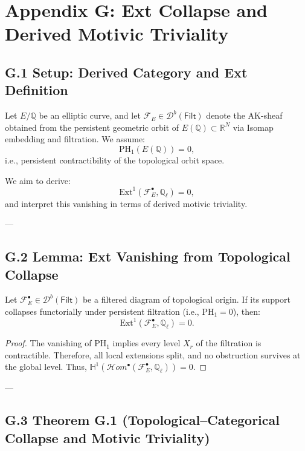 \section*{Appendix G: Ext Collapse and Derived Motivic Triviality}

\subsection*{G.1 Setup: Derived Category and Ext Definition}

Let \( E/\mathbb{Q} \) be an elliptic curve, and let \( \mathcal{F}_E \in \mathcal{D}^b(\mathsf{Filt}) \) denote the AK-sheaf obtained from the persistent geometric orbit of \( E(\mathbb{Q}) \subset \mathbb{R}^N \) via Isomap embedding and filtration.  
We assume:
\[
\mathrm{PH}_1(E(\mathbb{Q})) = 0,
\]
i.e., persistent contractibility of the topological orbit space.

We aim to derive:
\[
\mathrm{Ext}^1(\mathcal{F}_E^\bullet, \mathbb{Q}_\ell) = 0,
\]
and interpret this vanishing in terms of derived motivic triviality.

---

\subsection*{G.2 Lemma: Ext Vanishing from Topological Collapse}

\begin{lemma}
Let \( \mathcal{F}_E^\bullet \in \mathcal{D}^b(\mathsf{Filt}) \) be a filtered diagram of topological origin.  
If its support collapses functorially under persistent filtration (i.e., \( \mathrm{PH}_1 = 0 \)), then:
\[
\mathrm{Ext}^1(\mathcal{F}_E^\bullet, \mathbb{Q}_\ell) = 0.
\]
\end{lemma}

\begin{proof}
The vanishing of \( \mathrm{PH}_1 \) implies every level \( X_r \) of the filtration is contractible.  
Therefore, all local extensions split, and no obstruction survives at the global level.  
Thus, \( \mathbb{H}^1(\mathcal{H}om^\bullet(\mathcal{F}_E^\bullet, \mathbb{Q}_\ell)) = 0 \).
\end{proof}

---

\subsection*{G.3 Theorem G.1 (Topological–Categorical Collapse and Motivic Triviality)}

